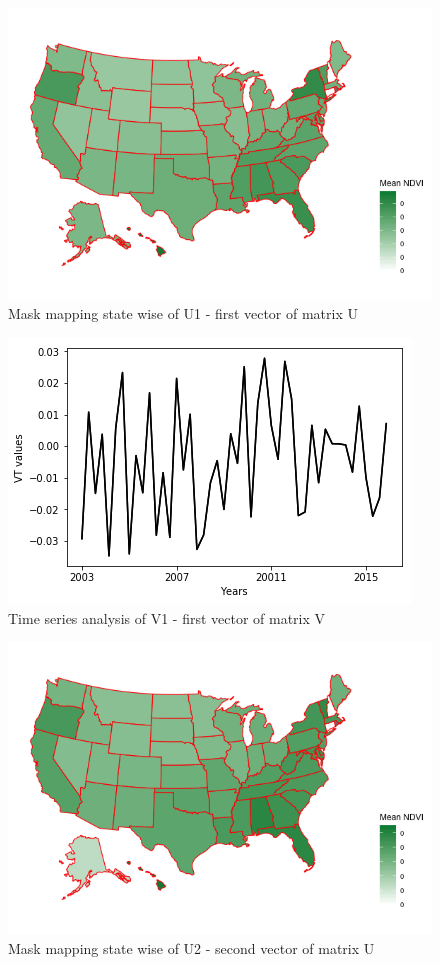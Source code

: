      \begin{figure}[H]
            \centering
            \includegraphics[width=0.85\linewidth]{figures/ch5/SVD/EOF_1.png}
            \caption{\label{fig:EOF_1} Mask mapping state wise of U1 - first vector of matrix U}
    \end{figure}
    
     \begin{figure}[H]
            \centering
            \includegraphics[width=0.85\linewidth]{figures/ch5/SVD/V1.png}
            \caption{\label{fig:V_1} Time series analysis of V1 - first vector of matrix V}
    \end{figure}
    
    \begin{figure}[H]
            \centering
            \includegraphics[width=0.85\linewidth]{figures/ch5/SVD/EOF_2.png}
            \caption{\label{fig:EOF_2} Mask mapping state wise of U2 - second vector of matrix U}
    \end{figure}
    
